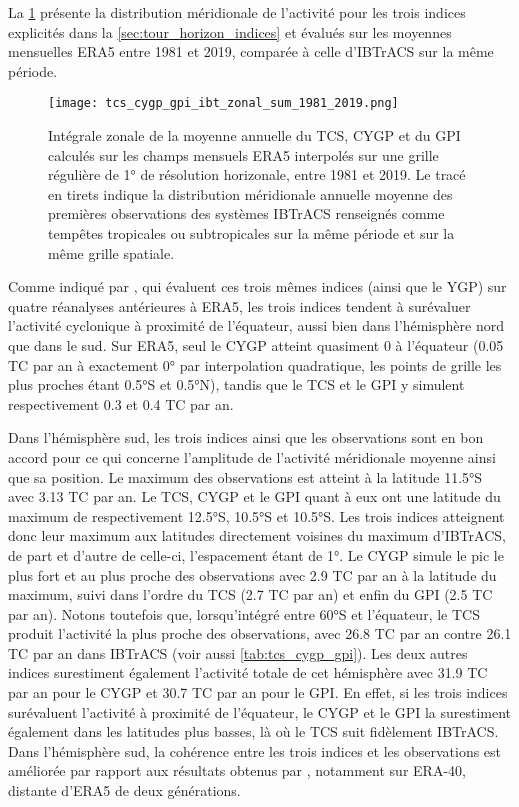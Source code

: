 \documentclass[../main.tex]{subfiles}
\begin{document}
La \cref{fig:tcs_cygp_gpi_zonal} présente la distribution méridionale de l'activité pour les trois indices explicités dans la \cref{sec:tour_horizon_indices} et
évalués sur les moyennes mensuelles ERA5 entre \num{1981} et \num{2019}, comparée à celle d'IBTrACS sur la même période. 
%
\begin{figure}[htb]
    \centering
    \texttt{[image: tcs\_cygp\_gpi\_ibt\_zonal\_sum\_1981\_2019.png]}
    \caption{Intégrale zonale de la moyenne annuelle du TCS, CYGP et du GPI calculés sur les champs mensuels ERA5 interpolés sur une grille régulière de 1° de
    résolution horizonale, entre 1981 et 2019. Le tracé en tirets indique la distribution méridionale annuelle moyenne des premières observations des systèmes
    IBTrACS renseignés comme tempêtes tropicales ou subtropicales sur la même période et sur la même grille spatiale.}
    \label{fig:tcs_cygp_gpi_zonal}
\end{figure}
%
Comme indiqué par \textcite{menkes_comparison_2012}, qui évaluent ces trois mêmes indices (ainsi que le YGP) sur quatre réanalyses antérieures à ERA5, les trois
indices tendent à surévaluer l'activité cyclonique à proximité de l'équateur, aussi bien dans l'hémisphère nord que dans le sud. Sur ERA5, seul le CYGP atteint
quasiment 0 à l'équateur (\num{0.05} TC par an à exactement 0° par interpolation quadratique, les points de grille les plus proches étant \ang{0.5}S et
\ang{0.5}N), tandis que le TCS et le GPI y simulent respectivement \num{0.3} et \num{0.4} TC par an.

Dans l'hémisphère sud, les trois indices ainsi que les
observations sont en bon accord pour ce qui concerne l'amplitude de l'activité méridionale moyenne ainsi que sa position. Le maximum des observations est
atteint à la latitude \ang{11.5}S avec \num{3.13} TC par an. Le TCS, CYGP et le GPI quant à eux ont une latitude du maximum de respectivement \ang{12.5}S,
\ang{10.5}S et \ang{10.5}S. Les trois indices atteignent donc leur maximum aux latitudes directement voisines du maximum d'IBTrACS, de part et d'autre de
celle-ci, l'espacement étant de \ang{1}. Le CYGP simule le pic le plus fort et au plus proche des observations avec \num{2.9} TC par an à la latitude du
maximum, suivi dans l'ordre du TCS (\num{2.7} TC par an) et enfin du GPI (\num{2.5} TC par an). Notons toutefois que, lorsqu'intégré entre \ang{60}S et
l'équateur, le TCS produit l'activité la plus proche des observations, avec \num{26.8} TC par an contre \num{26.1} TC par an dans IBTrACS (voir aussi
\cref{tab:tcs_cygp_gpi}). Les deux autres indices surestiment également l'activité totale de cet hémisphère avec \num{31.9} TC par an pour le CYGP et \num{30.7}
TC par an pour le GPI. En effet, si les trois indices surévaluent l'activité à proximité de l'équateur, le CYGP et le GPI la surestiment également dans les
latitudes plus basses, là où le TCS suit fidèlement IBTrACS. Dans l'hémisphère sud, la cohérence entre les trois indices et les observations est améliorée par
rapport aux résultats obtenus par \textcite{menkes_comparison_2012}, notamment sur ERA-40, distante d'ERA5 de deux générations.
\end{document}
